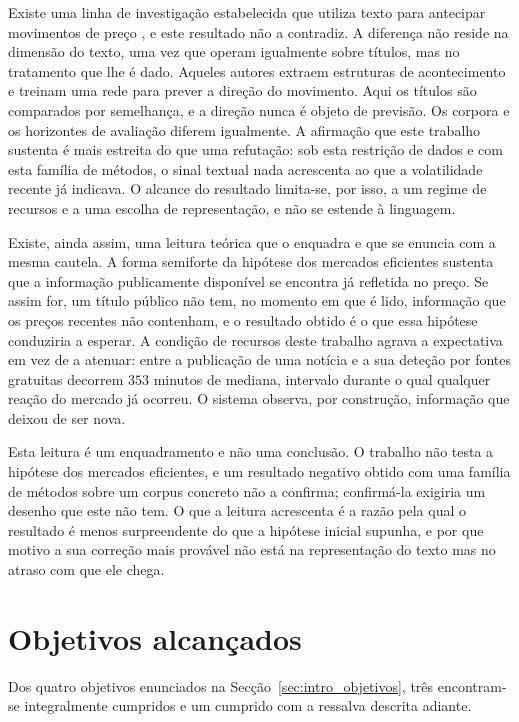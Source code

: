 Existe uma linha de investigação estabelecida que utiliza texto para antecipar movimentos de preço
\autocite{xing2018nlffsurvey, ding2015deep}, e este resultado não a contradiz. A diferença não reside na dimensão do texto, uma vez que \textcite{ding2015deep} operam igualmente
sobre títulos, mas no tratamento que lhe é dado. Aqueles autores extraem estruturas de
acontecimento e treinam uma rede para prever a direção do movimento. Aqui os títulos são
comparados por semelhança, e a direção nunca é objeto de previsão. Os corpora e os horizontes de avaliação diferem igualmente. A
afirmação que este trabalho sustenta é mais estreita do que uma refutação: sob esta restrição de
dados e com esta família de métodos, o sinal textual nada acrescenta ao que a volatilidade recente
já indicava. O alcance do resultado limita-se, por isso, a um regime de recursos e a uma escolha de
representação, e não se estende à linguagem.

Existe, ainda assim, uma leitura teórica que o enquadra e que se enuncia com a mesma cautela. A
forma semiforte da hipótese dos mercados eficientes \autocite{fama1970efficient} sustenta que a
informação publicamente disponível se encontra já refletida no preço. Se assim for, um título
público não tem, no momento em que é lido, informação que os preços recentes não contenham, e o
resultado obtido é o que essa hipótese conduziria a esperar. A condição de recursos deste trabalho
agrava a expectativa em vez de a atenuar: entre a publicação de uma notícia e a sua deteção por
fontes gratuitas decorrem $353$ minutos de mediana, intervalo durante o qual qualquer reação do
mercado já ocorreu. O sistema observa, por construção, informação que deixou de ser nova.

Esta leitura é um enquadramento e não uma conclusão. O trabalho não testa a hipótese dos mercados
eficientes, e um resultado negativo obtido com uma família de métodos sobre um corpus concreto não
a confirma; confirmá-la exigiria um desenho que este não tem. O que a leitura acrescenta é a razão
pela qual o resultado é menos surpreendente do que a hipótese inicial supunha, e por que motivo a
sua correção mais provável não está na representação do texto mas no atraso com que ele chega.

\section{Objetivos alcançados}
\label{sec:con_objetivos}

Dos quatro objetivos enunciados na Secção~\ref{sec:intro_objetivos}, três encontram-se integralmente
cumpridos e um cumprido com a ressalva descrita adiante.

